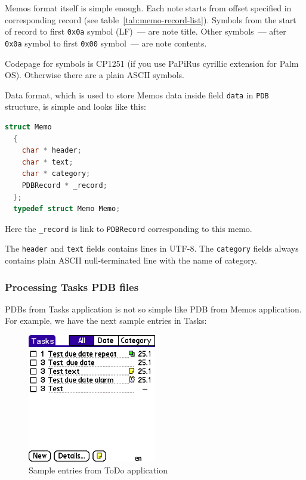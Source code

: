 \documentclass[a4paper,12pt,oneside]{scrartcl}
\begin{document}
Memos format itself is simple enough. Each note starts from offset specified in
corresponding record (see table~\ref{tab:memo-record-list}). Symbols from the
start of record to first \texttt{0x0a} symbol (LF)~--- are note title. Other
symbols~--- after \texttt{0x0a} symbol to first \texttt{0x00} symbol~--- are
note contents.

Codepage for symbols is CP1251 (if you use PaPiRus cyrillic extension for Palm
OS). Otherwise there are a plain ASCII symbols.

Data format, which is used to store Memos data inside field \texttt{data} in
\texttt{PDB} structure, is simple and looks like this:
\begin{lstlisting}[language=C, caption={C structure to store memo data}]
  struct Memo
  {
	char * header;
	char * text;
    char * category;
    PDBRecord * _record;
  };
  typedef struct Memo Memo;
\end{lstlisting}

Here the \texttt{\_record} is link to \texttt{PDBRecord} corresponding to this
memo.

The \texttt{header} and \texttt{text} fields contains lines in UTF-8. The
\texttt{category} fields always contains plain ASCII null-terminated line with
the name of category.

\subsubsection{Processing Tasks PDB files}
\label{sec:processing-todo-pdb}

PDBs from Tasks application is not so simple like PDB from Memos
application. For example, we have the next sample entries in Tasks:

\begin{figure}[H]
  \centering
  \includegraphics[width=0.5\textwidth]{tasks.png}
  \caption{Sample entries from ToDo application}
  \label{fig:sample-todos}
\end{figure}
\end{document}
